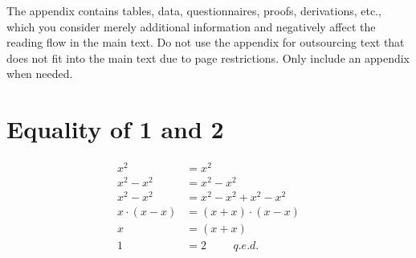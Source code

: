 \documentclass[11pt,a4paper]{article}
\begin{document}
\begin{appendix}
	The appendix contains tables, data, questionnaires, proofs, derivations, etc., which you consider merely additional information and negatively affect the reading flow in the main text. Do not use the appendix for outsourcing text that does not fit into the main text due to page restrictions. Only include an appendix when needed.
	\section{Equality of 1 and 2}
	\label{proof:1equal2}
	\begin{align}
	x^2 &= x^2 \\
	x^2 - x^2 &= x^2 - x^2 \\
	x^2 - x^2 &= x^2 - x^2 + x^2 - x^2	\\
	x\cdot\left(x-x\right) &= \left(x+x\right)\cdot\left(x-x\right)	\\
	x &= \left(x+x\right)	\\
	1 &= 2	\hspace{1cm} q.e.d.
	\end{align}

\end{appendix}
\end{document}
